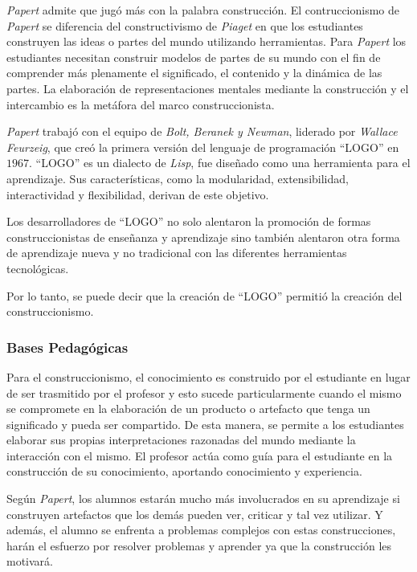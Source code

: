 \textit{Papert} admite que jugó más con la palabra construcción. El
contruccionismo de \textit{Papert} se diferencia del constructivismo de
\textit{Piaget} en que los estudiantes construyen las ideas o partes del mundo
utilizando herramientas. Para \textit{Papert} los estudiantes necesitan
construir modelos de partes de su mundo con el fin de comprender más plenamente
el significado, el contenido y la dinámica de las partes. La elaboración de
representaciones mentales mediante la construcción y el intercambio es la
metáfora del marco construccionista\cite{historia:2014}.

\textit{Papert} trabajó con el equipo de \textit{Bolt, Beranek y Newman},
liderado por \textit{Wallace Feurzeig}, que creó la primera versión del lenguaje
de programación \enquote{LOGO} en $1967$. \enquote{LOGO} es un dialecto de
\textit{Lisp}, fue diseñado como una herramienta para el aprendizaje. Sus
características, como la modularidad, extensibilidad, interactividad y
flexibilidad, derivan de este objetivo\cite{logo:sg}.

Los desarrolladores de \enquote{LOGO} no solo alentaron la promoción de formas
construccionistas de enseñanza y aprendizaje sino también alentaron otra forma
de aprendizaje nueva y no tradicional con las diferentes herramientas
tecnológicas\cite{historia:2014}. 

Por lo tanto, se puede decir que la creación de \enquote{LOGO} permitió la
creación del construccionismo\cite{historia:2014}.

\subsubsection{Bases Pedagógicas}

Para el construccionismo, el conocimiento es construido por el estudiante en
lugar de ser trasmitido por el profesor\cite{moses:2003} y esto sucede
particularmente cuando el mismo se compromete en la elaboración de un producto o
artefacto que tenga un significado y pueda ser compartido\cite{valdivia:sg}. De
esta manera, se permite a los estudiantes elaborar sus propias interpretaciones
razonadas del mundo mediante la interacción con el mismo. El profesor actúa como
guía para el estudiante en la construcción de su conocimiento, aportando
conocimiento y experiencia.

Según \textit{Papert}, los alumnos estarán mucho más involucrados en su aprendizaje si
construyen artefactos que los demás pueden ver, criticar y tal vez utilizar. Y
además, el alumno se enfrenta a problemas complejos con estas construcciones,
harán el esfuerzo por resolver problemas y aprender ya que la construcción les
motivará\cite{const:vs}.

